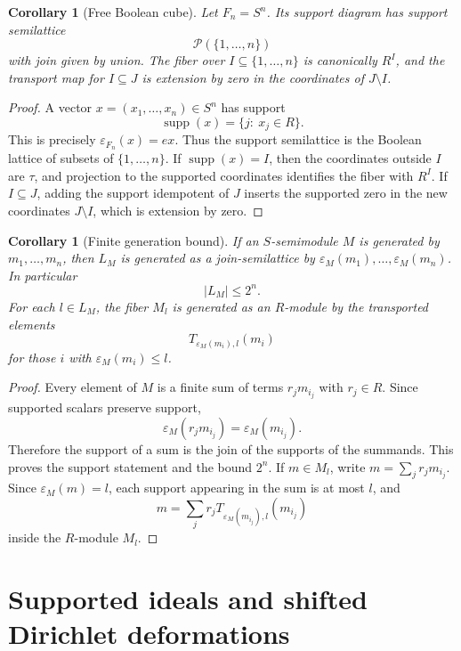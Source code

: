 \documentclass[11pt]{article}
\newcommand{\supp}{\operatorname{supp}}
\newcommand{\eps}{\varepsilon}
\theoremstyle{plain}
\newtheorem{corollary}[theorem]{Corollary}
\theoremstyle{definition}
\begin{document}
\begin{corollary}[Free Boolean cube]\label{cor:free-cube}
Let \(F_n=S^n\).  Its support diagram has support semilattice
\[
   \mathcal P(\{1,\ldots,n\})
\]
with join given by union.  The fiber over \(I\subseteq\{1,\ldots,n\}\) is canonically \(R^I\), and the transport map for \(I\subseteq J\) is extension by zero in the coordinates of \(J\setminus I\).
\end{corollary}

\begin{proof}
A vector \(x=(x_1,\ldots,x_n)\in S^n\) has support
\[
   \supp(x)=\{j:\ x_j\in R\}.
\]
This is precisely \(\eps_{F_n}(x)=ex\).  Thus the support semilattice is the Boolean lattice of subsets of \(\{1,\ldots,n\}\).  If \(\supp(x)=I\), then the coordinates outside \(I\) are \(\tau\), and projection to the supported coordinates identifies the fiber with \(R^I\).  If \(I\subseteq J\), adding the support idempotent of \(J\) inserts the supported zero in the new coordinates \(J\setminus I\), which is extension by zero.
\end{proof}

\begin{corollary}[Finite generation bound]\label{cor:finite-generation}
If an \(S\)-semimodule \(M\) is generated by \(m_1,\ldots,m_n\), then \(L_M\) is generated as a join-semilattice by \(\eps_M(m_1),\ldots,\eps_M(m_n)\).  In particular
\[
   |L_M|\le 2^n.
\]
For each \(l\in L_M\), the fiber \(M_l\) is generated as an \(R\)-module by the transported elements
\[
   T_{\eps_M(m_i),l}(m_i)
\]
for those \(i\) with \(\eps_M(m_i)\le l\).
\end{corollary}

\begin{proof}
Every element of \(M\) is a finite sum of terms \(r_jm_{i_j}\) with \(r_j\in R\).  Since supported scalars preserve support,
\[
   \eps_M(r_jm_{i_j})=\eps_M(m_{i_j}).
\]
Therefore the support of a sum is the join of the supports of the summands.  This proves the support statement and the bound \(2^n\).  If \(m\in M_l\), write \(m=\sum_j r_jm_{i_j}\).  Since \(\eps_M(m)=l\), each support appearing in the sum is at most \(l\), and
\[
   m=\sum_j r_j T_{\eps_M(m_{i_j}),l}(m_{i_j})
\]
inside the \(R\)-module \(M_l\).
\end{proof}


\section{Supported ideals and shifted Dirichlet deformations}\label{sec:supported-ideals-shifted-flow}
\end{document}
